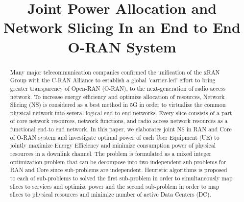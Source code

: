 \documentclass[conference]{IEEEtran}
\begin{document}
\title{Joint Power Allocation and Network Slicing In an End to End O-RAN System
}

\author{
\and
{}

}

\maketitle

\begin{abstract}
Many major telecommunication companies confirmed the unification of the xRAN Group with the C-RAN Alliance to establish a global 'carrier-led' effort to bring greater transparency of Open-RAN 
(O-RAN), to the next-generation of radio access network. \newline
To increase energy efficiency and optimize allocation of resources, Network Slicing (NS) is considered as a best method in 5G in order to virtualize the common physical network into several logical end-to-end networks. Every slice consists of a part of core network resources, network functions, and radio access network resources as a functional end-to end network. \newline
In this paper, we elaborates joint NS in RAN and Core of O-RAN system and investigate optimal power 
of each User Equipment (UE) to jointly maximize Energy Efficiency and minimize consumption power of physical resources in a downlink channel. The problem is formulated as a mixed integer optimization problem that can be decompose into two independent sub-problems for RAN and Core since sub-problems are independent. 
Heuristic algorithms is proposed to each of sub-problems to solved the first sub-problem in order to simultaneously map slices to services and optimize power and the second sub-problem in order to map slices to physical resources and minimize number of active Data Centers (DC).
\end{abstract}
\end{document}
